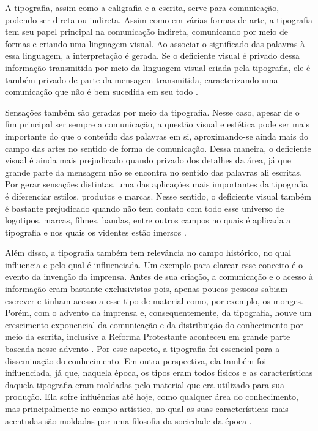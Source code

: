 A tipografia, assim como a caligrafia e a escrita, serve para comunicação, podendo ser direta ou indireta. Assim como em várias formas de arte, a tipografia tem seu papel principal na comunicação indireta, comunicando por meio de formas e criando uma linguagem visual. Ao associar o significado das palavras à essa linguagem, a interpretação é gerada. Se o deficiente visual é privado dessa informação transmitida por meio da linguagem visual criada pela tipografia, ele é também privado de parte da mensagem transmitida, caracterizando uma comunicação que não é bem sucedida em seu todo .

Sensações também são geradas por meio da tipografia. Nesse caso, apesar de o fim principal ser sempre a comunicação, a questão visual e estética pode ser mais importante do que o conteúdo das palavras em si, aproximando-se ainda mais do campo das artes no sentido de forma de comunicação. Dessa maneira, o deficiente visual é ainda mais prejudicado quando privado dos detalhes da área, já que grande parte da mensagem não se encontra no sentido das palavras ali escritas. Por gerar sensações distintas, uma das aplicações mais importantes da tipografia é diferenciar estilos, produtos e marcas. Nesse sentido, o deficiente visual também é bastante prejudicado quando não tem contato com todo esse universo de logotipos, marcas, filmes, bandas, entre outros campos no quais é aplicada a tipografia e nos quais os videntes estão imersos .

Além disso, a tipografia também tem relevância no campo histórico, no qual influencia e pelo qual é influenciada. Um exemplo para clarear esse conceito é o evento da invenção da imprensa. Antes de sua criação, a comunicação e o acesso à informação eram bastante exclusivistas pois, apenas poucas pessoas sabiam escrever e tinham acesso a esse tipo de material como, por exemplo, os monges. Porém, com o advento da imprensa e, consequentemente, da tipografia, houve um crescimento exponencial da comunicação e da distribuição do conhecimento por meio da escrita, inclusive a Reforma Protestante aconteceu em grande parte baseada nesse advento . Por esse aspecto, a tipografia foi essencial para a disseminação do conhecimento. Em outra perspectiva, ela também foi influenciada, já que, naquela época, os tipos eram todos físicos e as características daquela tipografia eram moldadas pelo material que era utilizado para sua produção. Ela sofre influências até hoje, como qualquer área do conhecimento, mas principalmente no campo artístico, no qual as suas características mais acentudas são moldadas por uma filosofia da sociedade da época  .




